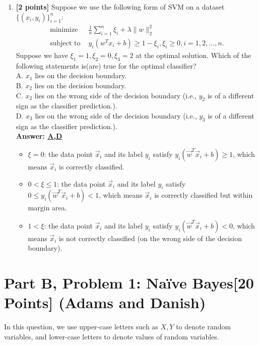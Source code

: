 \documentclass{article}
\begin{document}
\begin{enumerate}
		\item \textbf{[2 points]} Suppose we use the following form of SVM on a dataset $\{(x_i,y_i)\}_{i=1}^n$:
		\begin{align*}
		\text{minimize}\; & \frac{1}{n}\sum_{i=1}^n \xi_i+\lambda\|w\|_2^2\\
		\text{subject to } & y_i(w^Tx_i+b)\geq 1-\xi_i, \xi_i\geq 0, i=1,2,...,n.
		\end{align*}
		Suppose we have $\xi_1=1, \xi_2=0, \xi_3=2$ at the optimal solution. Which of the following statements is(are) true for the optimal classifier?\\
		A. $x_1$ lies on the decision boundary.\\
		B. $x_2$ lies on the decision boundary.\\
		C. $x_2$ lies on the wrong side of the decision boundary (i.e., $y_2$ is of a different sign as the classifier prediction.).\\
		D. $x_3$ lies on the wrong side of the decision boundary (i.e., $y_3$ is of a different sign as the classifier prediction.).\\
		\textbf{Answer: \underline{A,D}}\\
		\begin{itemize}
			\item $\xi=0$: the data point $\vec{x}_i$ and its label $y_i$ satisfy $y_i(\vec{w}^T\vec{x}_i+b) \geq 1$, which means $\vec{x}_i$ is correctly classified.
			\item $0<\xi\leq1$: the data point $\vec{x}_i$ and its label $y_i$ satisfy $0\leq y_i(\vec{w}^T\vec{x}_i+b) <1$, which means $\vec{x}_i$ is correctly classified but within margin area.
			\item $1<\xi$: the data point $\vec{x}_i$ and its label $y_i$ satisfy $y_i(\vec{w}^T\vec{x}_i+b) <0$, which means $\vec{x}_i$ is not correctly classified (on the wrong side of the decision boundary).
		\end{itemize}

	\end{enumerate}
	\clearpage


\section*{Part B, Problem 1: Na{\"i}ve Bayes[20 Points] (Adams and Danish)}

In this question, we use upper-case letters such as $X,Y$ to denote random variables, and lower-case letters to denote values of random variables.
\end{document}
